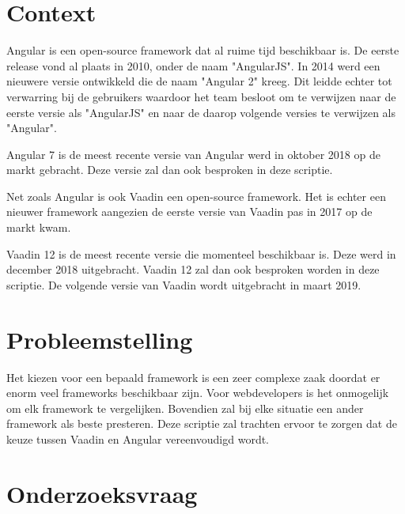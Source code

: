 \section{Context}
\label{sec:context}
Angular is een open-source framework dat al ruime tijd beschikbaar is. De eerste  release vond al plaats in 2010, onder de naam "AngularJS". 
In 2014 werd een nieuwere versie ontwikkeld die de naam "Angular 2" kreeg. Dit leidde echter tot verwarring bij de gebruikers waardoor het team besloot om te verwijzen naar de eerste versie als "AngularJS"  en naar de daarop volgende versies te verwijzen als "Angular". 

Angular 7 is de meest recente versie van Angular werd in oktober 2018 op de markt gebracht. Deze versie zal dan ook besproken in deze scriptie. 

Net zoals Angular is ook Vaadin een open-source framework. Het is echter een nieuwer  framework aangezien de eerste versie van Vaadin pas in 2017 op de markt kwam. 

Vaadin 12 is de meest recente versie die momenteel beschikbaar is. Deze werd in december 2018 uitgebracht. Vaadin 12 zal dan ook besproken worden in deze scriptie. 
De volgende versie van Vaadin wordt uitgebracht in maart 2019.

\section{Probleemstelling}
\label{sec:probleemstelling}
\iffalse
Uit je probleemstelling moet duidelijk zijn dat je onderzoek een meerwaarde heeft voor een concrete doelgroep. De doelgroep moet goed gedefinieerd en afgelijnd zijn. Doelgroepen als ``bedrijven,'' ``KMO's,'' systeembeheerders, enz.~zijn nog te vaag. Als je een lijstje kan maken van de personen/organisaties die een meerwaarde zullen vinden in deze bachelorproef (dit is eigenlijk je steekproefkader), dan is dat een indicatie dat de doelgroep goed gedefinieerd is. Dit kan een enkel bedrijf zijn of zelfs één persoon (je co-promotor/opdrachtgever).
\fi
Het kiezen voor een bepaald framework is een zeer complexe zaak doordat er enorm veel frameworks beschikbaar zijn. Voor webdevelopers is het onmogelijk om elk framework te vergelijken. 
Bovendien zal bij elke situatie een ander framework als beste presteren. 
Deze scriptie zal trachten ervoor te zorgen dat de keuze tussen Vaadin en Angular  vereenvoudigd wordt. 

\section{Onderzoeksvraag}
\label{sec:onderzoeksvraag}
\iffalse
Wees zo concreet mogelijk bij het formuleren van je onderzoeksvraag. Een onderzoeksvraag is trouwens iets waar nog niemand op dit moment een antwoord heeft (voor zover je kan nagaan). Het opzoeken van bestaande informatie (bv. ``welke tools bestaan er voor deze toepassing?'') is dus geen onderzoeksvraag. Je kan de onderzoeksvraag verder specifiëren in deelvragen. Bv.~als je onderzoek gaat over performantiemetingen, dan 
\fi

